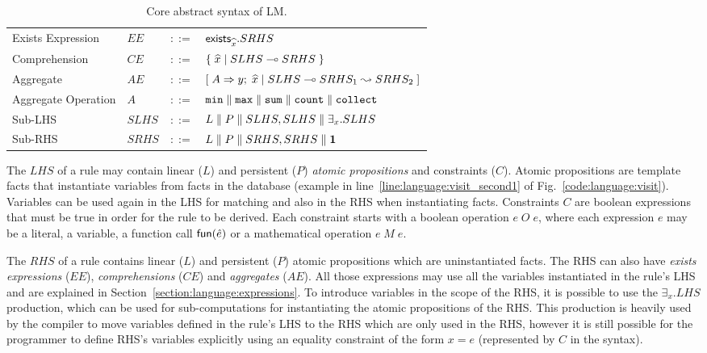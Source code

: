 \begin{table}[h]
\begin{tabular}{ l l c l }
  
  Exists Expression & $EE$ & $::=$ & $\mathsf{exists}_{\widehat{x}}. SRHS$ \\
  Comprehension & $CE$ & $::=$ & $\{ \; \widehat{x} \; | \; SLHS \multimap SRHS \; \}$ \\

  Aggregate & $AE$ & $::=$ & $[\; A \Rightarrow y; \; \widehat{x} \; | \; SLHS \multimap SRHS_1 \leadsto SRHS_2 \;]$ \\
  Aggregate Operation & $A$ & $::=$ & $\mathtt{min} \; \Vert \; \mathtt{max} \; \Vert \;
\mathtt{sum} \; \Vert \; \mathtt{count} \; \Vert \; \mathtt{collect}$ \\
  
  Sub-LHS & $SLHS$ & $::=$ & $L \; \Vert \; P \; \Vert \; SLHS, SLHS \; \Vert \; \exists_{x}. SLHS$\\
  Sub-RHS & $SRHS$ & $::=$ & $L \; \Vert \; P \; \Vert \; SRHS, SRHS \; \Vert \; \mathbf{1}$\\
  
\end{tabular}
\caption{Core abstract syntax of LM.}\label{tbl:language:ast}
\end{table}

The $LHS$ of a rule may contain linear ($L$) and persistent ($P$) \emph{atomic
propositions} and constraints ($C$). Atomic propositions are template facts that
instantiate variables from facts in the database (example in
line~\ref{line:language:visit_second1} of Fig.~\ref{code:language:visit}).
Variables can be used again in the LHS for matching and also in the RHS when
instantiating facts.  Constraints $C$ are boolean expressions that must be true
in order for the rule to be derived. Each constraint starts with a boolean
operation $e \; O \; e$, where each expression $e$ may be a literal, a variable,
a function call $\mathsf{fun}(\hat{e})$ or a mathematical operation $e \; M \; e$.

The $RHS$ of a rule contains linear ($L$) and persistent ($P$) atomic
propositions which are uninstantiated facts. The RHS can also have \emph{exists
expressions} ($EE$), \emph{comprehensions} ($CE$) and \emph{aggregates} ($AE$).
All those expressions may use all the variables instantiated in the rule's LHS
and are explained in Section~\ref{section:language:expressions}.
To introduce variables in the scope of the RHS, it is possible to use the
$\exists_x. LHS$ production, which can be used for sub-computations for
instantiating the atomic propositions of the RHS. This production is heavily
used by the compiler to move variables defined in the rule's LHS to the RHS
which are only used in the RHS, however it is still possible for the programmer
to define RHS's variables explicitly using an equality constraint of the form $x
= e$ (represented by $C$ in the syntax).

